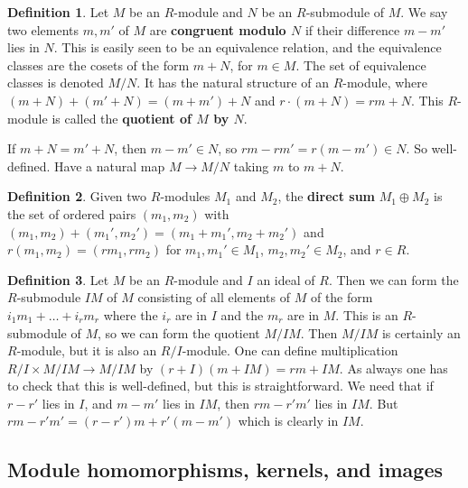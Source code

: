 \documentclass{article}
\newcommand{\rb}[1]{\left( #1 \right)}
\theoremstyle{definition}\newtheorem{definition}{Definition}[subsection]
\theoremstyle{definition}\newtheorem{remark}[definition]{Remark}
\theoremstyle{definition}\newtheorem*{example}{Example}
\theoremstyle{definition}\newtheorem*{note}{Note}
\begin{document}
\begin{definition}
Let $ M $ be an $ R $-module and $ N $ be an $ R $-submodule of $ M $. We say two elements $ m, m' $ of $ M $ are \textbf{congruent modulo $ N $} if their difference $ m - m' $ lies in $ N $. This is easily seen to be an equivalence relation, and the equivalence classes are the cosets of the form $ m + N $, for $ m \in M $. The set of equivalence classes is denoted $ M / N $. It has the natural structure of an $ R $-module, where $ \rb{m + N} + \rb{m' + N} = \rb{m + m'} + N $ and $ r \cdot \rb{m + N} = rm + N $. This $ R $-module is called the \textbf{quotient of $ M $ by $ N $}.
\end{definition}

If $ m + N = m' + N $, then $ m - m' \in N $, so $ rm - rm' = r\rb{m - m'} \in N $. So well-defined. Have a natural map $ M \to M / N $ taking $ m $ to $ m + N $.

\begin{definition}
Given two $ R $-modules $ M_1 $ and $ M_2 $, the \textbf{direct sum} $ M_1 \oplus M_2 $ is the set of ordered pairs $ \rb{m_1, m_2} $ with $ \rb{m_1, m_2} + \rb{m_1', m_2'} = \rb{m_1 + m_1', m_2 + m_2'} $ and $ r\rb{m_1, m_2} = \rb{rm_1, rm_2} $ for $ m_1, m_1' \in M_1 $, $ m_2, m_2' \in M_2 $, and $ r \in R $.
\end{definition}

\begin{definition}
Let $ M $ be an $ R $-module and $ I $ an ideal of $ R $. Then we can form the $ R $-submodule $ IM $ of $ M $ consisting of all elements of $ M $ of the form $ i_1m_1 + \dots + i_rm_r $ where the $ i_r $ are in $ I $ and the $ m_r $ are in $ M $. This is an $ R $-submodule of $ M $, so we can form the quotient $ M / IM $. Then $ M / IM $ is certainly an $ R $-module, but it is also an $ R / I $-module. One can define multiplication $ R / I \times M / IM \to M / IM $ by $ \rb{r + I}\rb{m + IM} = rm + IM $. As always one has to check that this is well-defined, but this is straightforward. We need that if $ r - r' $ lies in $ I $, and $ m - m' $ lies in $ IM $, then $ rm - r'm' $ lies in $ IM $. But $ rm - r'm' = \rb{r - r'}m + r'\rb{m - m'} $ which is clearly in $ IM $.
\end{definition}

\subsection{Module homomorphisms, kernels, and images}
\end{document}
